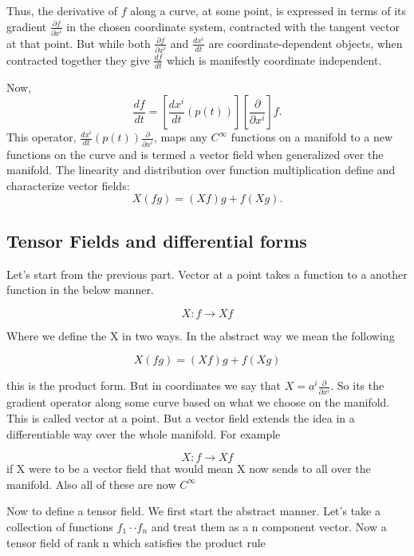 \documentclass{article}
\begin{document}
Thus, the derivative of $f$ along a curve, at some point, is expressed in terms of its gradient $\frac{\partial f}{\partial x^i}$ in the chosen coordinate system, contracted with the tangent vector at that point. But while both $\frac{\partial f}{\partial x^i}$ and $\frac{dx^i}{dt}$ are coordinate-dependent objects, when contracted together they give $\frac{df}{dt}$ which is manifestly coordinate independent. 

Now, 
\[
\frac{df}{dt} = \left[ \frac{dx^i}{dt} (p(t)) \right] \left[ \frac{\partial}{\partial x^i} \right] f.
\]
This operator, $\frac{dx^i}{dt} (p(t)) \frac{\partial}{\partial x^i}$, maps any $C^\infty$ functions on a manifold to a new functions on the curve and is termed a vector field when generalized over the manifold. The linearity and distribution over function multiplication define and characterize vector fields:
\[
X(fg) = (Xf)g + f(Xg).
\]

\subsection{Tensor Fields and differential forms} 

Let's start from the previous part. Vector at a point takes a function to a another function in the below manner. 

\[ X : f \to X f \]

Where we define the X in two ways. In the abstract way we mean the following 

\[ X(fg) = (Xf)g + f(Xg) \]

this is the product form. But in coordinates we say that $ X = a^i \frac{\partial}{\partial x^i}$. So its the gradient operator along some curve based on what we choose on the manifold. This is called vector at a point. But a vector field extends the idea in a differentiable way over the whole manifold. For example 

\[ X:f \to Xf \]
if X were to be a vector field that would mean X now sends to all over the manifold. Also all of these are now \( C^{\infty}\)

Now to define a tensor field. We first start the abstract manner. Let's take a collection of functions \( f_1 \cdot \cdot f_n\) and treat them as a n component vector. 
Now a tensor field of rank n which satisfies the product rule 
\end{document}
